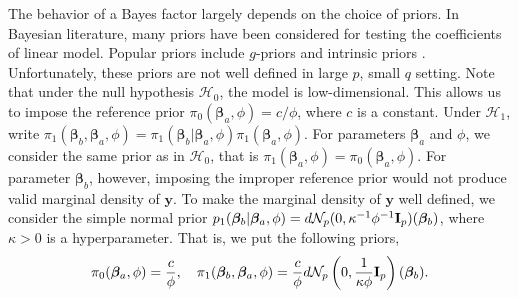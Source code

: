 \documentclass[11pt]{article}
\newcommand{\By}{\mathbf{y}}    \newcommand{\Bz}{\mathbf{z}}
\newcommand{\bfsym}[1]{\ensuremath{\boldsymbol{#1}}}
\def\bbeta{\bfsym \beta}
\theoremstyle{plain}
\theoremstyle{definition}
\theoremstyle{remark}
\begin{document}
The behavior of a Bayes factor largely depends on the choice of priors.
In Bayesian literature, many priors have been considered for testing the coefficients of linear model.
Popular priors include $g$-priors \citep{Liang2008Mixtures} and intrinsic priors \citep{Casella2006Obj}.
Unfortunately, these priors are not well defined in large $p$, small $q$ setting.
Note that under the null hypothesis $\mathcal H_0$, the model is low-dimensional.
This allows us to impose the reference prior $\pi_0 (\bbeta_a,\phi)=c/\phi$, where $c$ is a constant.
Under $\mathcal H_1$,
write $\pi_1(\bbeta_b,\bbeta_a,\phi)=\pi_1(\bbeta_b|\bbeta_a,\phi) \pi_1(\bbeta_a,\phi)$.
For parameters $\bbeta_a $ and $\phi$, we consider the same prior as in $\mathcal H_0$, that is $\pi_1(\bbeta_a,\phi)=\pi_0(\bbeta_a,\phi)$.
For parameter $\bbeta_b$, however, imposing the improper reference prior would not produce valid marginal density of $\By$.
To make the marginal density of $\By$ well defined,
we consider the simple normal prior $p_1(\bbeta_b|\bbeta_a, \phi) = d \mathcal N_{p} (0, \kappa^{-1} \phi^{-1} \BI_{p}) (\bbeta_b) $, where $\kappa>0$ is a hyperparameter.
That is, we put the following priors,
\begin{equation}\label{priors}
    \pi_0(\bbeta_a,\phi)= \frac{c}{\phi},\quad
    \pi_1(\bbeta_b,\bbeta_a,\phi)=\frac{c}{\phi} d \mathcal N_{p} \left(0, \frac{1}{\kappa \phi} \BI_{p}\right) (\bbeta_b).
\end{equation}
\end{document}
